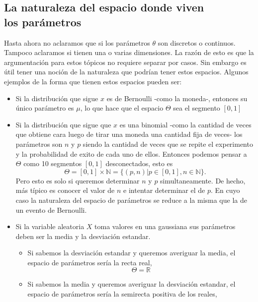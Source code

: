 \subsection{La naturaleza del espacio donde viven\\ los parámetros}
Hasta ahora no aclaramos que si los parámetros $\theta$ son discretos o continuos. Tampoco aclaramos si tienen una o varias dimensiones. La razón de esto es que la argumentación para estos tópicos no requiere separar por casos. Sin embargo es útil tener una noción de la naturaleza que podrían tener estos espacios. Algunos ejemplos de la forma que tienen estos espacios pueden ser:
\begin{itemize}
    \item Si la distribución que sigue $x$ es de Bernoulli -como la moneda-, entonces su único parámetro es $\mu$, lo que hace que el espacio $\Theta$ sea el segmento $[0,1]$
    \item Si la distribución que sigue que $x$ es una binomial -como la cantidad de veces que obtiene cara luego de tirar una moneda una cantidad fija de veces- los parámetros son $n$ y $p$ siendo la cantidad de veces que se repite el experimento y la probabilidad de exito de cada uno de ellos. Entonces podemos pensar a $\Theta$ como 10 segmentos $[0,1]$ desconectados, esto es
    \begin{equation}
        \Theta = [0,1]\times \mathbb{N} = \{ (p,n)|p\in[0,1],n\in\mathbb{N}\}.
    \end{equation}
    Pero esto es solo si queremos determinar $n$ y $p$ simultaneamente. De hecho, más típico es conocer el valor de $n$ e intentar determinar el de $p$. En cuyo caso la naturaleza del espacio de parámetros se reduce a la misma que la de un evento de Bernoulli.
    \item Si la variable aleatoria $X$ toma valores en una gaussiana sus parámetros deben ser la media y la desviación estandar.
    \begin{itemize}
        \item Si sabemos la desviación estandar y queremos averiguar la media, el espacio de parámetros sería la recta real,
        \begin{equation}
            \Theta = \mathbb{R}
        \end{equation}
        \item Si sabemos la media y queremos averiguar la desviación estandar, el espacio de parámetros sería la semirecta positiva de los reales,
        \begin{equation}

\end{equation}
\end{itemize}
\end{itemize}
